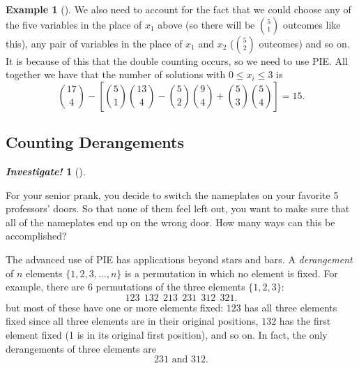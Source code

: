 \documentclass[10pt,]{book}
\theoremstyle{plain}
\theoremstyle{definition}
\newtheorem{example}[theorem]{Example}
\theoremstyle{definition}
\newtheorem{investigation}[project]{\emph{Investigate!}}
\theoremstyle{definition}
\numberwithin{equation}{chapter}
\begin{document}
\begin{example}[]
          We also need to account for the fact that we could choose any of the five variables in the place of \(x_1\) above (so there will be \({5 \choose 1}\) outcomes like this), any pair of variables in the place of \(x_1\) and \(x_2\) (\({5 \choose 2}\) outcomes) and so on. It is because of this that the double counting occurs, so we need to use PIE. All together we have that the number of solutions with \(0 \le x_i \le 3\) is
          \begin{equation*}
            {17 \choose 4} - \left[{5\choose 1}{13 \choose 4} - {5 \choose 2}{9 \choose 4} + {5 \choose 3}{5 \choose 4}\right] = 15.
          \end{equation*}
\end{example}
\typeout{************************************************}
\typeout{************************************************}
\subsection[Counting Derangements]{Counting Derangements}\label{subsec_derangements}
\begin{investigation}[]\label{investigation-12}

        For your senior prank, you decide to switch the nameplates on your favorite 5 professors' doors. So that none of them feel left out, you want to make sure that all of the nameplates end up on the wrong door. How many ways can this be accomplished?
\end{investigation}

      The advanced use of PIE has applications beyond stars and bars. A \emph{derangement} of \(n\) elements \(\{1,2,3,\ldots, n\}\) is a permutation in which no element is fixed. For example, there are \(6\) permutations of the three elements \(\{1,2,3\}\):
      \begin{equation*}
        123 ~~ 132 ~~ 213 ~~ 231 ~~ 312 ~~ 321.
      \end{equation*}
      but most of these have one or more elements fixed: \(123\) has all three elements fixed since all three elements are in their original positions, \(132\) has the first element fixed (1 is in its original first position), and so on. In fact, the only derangements of three elements are
      \begin{equation*}
        231 \text{ and } 312.
      \end{equation*}
\par
\end{document}
